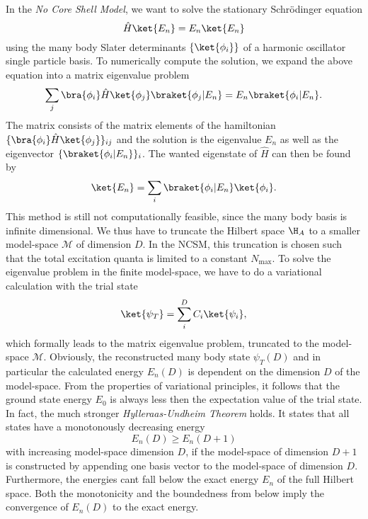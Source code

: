 In the \textit{No Core Shell Model}, we want to solve the stationary Schrödinger equation
\begin{equation}
  \label{eqn:ncsmsgl}
  \hat{H} \ket{E_n} = E_n \ket{E_n}
\end{equation}
using the many body Slater determinants $\{\ket{\phi_i}\}$ of a harmonic oscillator single particle basis. To numerically compute the solution, we expand the above equation into a matrix eigenvalue problem
\begin{equation}
  \sum_j \bra{\phi_i}\hat{H}\ket{\phi_j}\braket{\phi_j | E_n} = E_n \braket{\phi_i | E_n}.
\end{equation}
The matrix consists of the matrix elements of the hamiltonian $\{\bra{\phi_i}\hat{H}\ket{\phi_j}\}_{ij}$ and the solution is the eigenvalue $E_n$ as well as the eigenvector $\{\braket{\phi_i|E_n}\}_i$. The wanted eigenstate of $\hat{H}$ can then be found by
\begin{equation}
  \ket{E_n} = \sum_i \braket{\phi_i | E_n} \ket{\phi_i}.
\end{equation}
This method is still not computationally feasible, since the many body basis is infinite dimensional. We thus have to truncate the Hilbert space $\H_A$ to a smaller model-space $\mathcal{M}$ of dimension $D$. In the NCSM, this truncation is chosen such that the total excitation quanta is limited to a constant $N_{\mathrm{max}}$.
To solve the eigenvalue problem in the finite model-space, we have to do a variational calculation with the trial state
\begin{equation}
  \ket{\psi_T} = \sum_i^{D} C_i \ket{\psi_i},
\end{equation}
which formally leads to the matrix eigenvalue problem, truncated to the model-space $\mathcal{M}$. Obviously, the reconstructed many body state $\psi_T(D)$ and in particular the calculated energy $E_n(D)$ is dependent on the dimension $D$ of the model-space. From the properties of variational principles, it follows that the ground state energy $E_0$ is always less then the expectation value of the trial state. In fact, the much stronger \textit{Hylleraas-Undheim Theorem} holds. It states that all states have a monotonously decreasing energy
\begin{equation}
  E_n(D) \geq E_n(D+1)
\end{equation}
with increasing model-space dimension $D$, if the model-space of dimension $D+1$ is constructed by appending one basis vector to the model-space of dimension $D$. Furthermore, the energies cant fall below the exact energy $E_n$ of the full Hilbert space. Both the monotonicity and the boundedness from below imply the convergence of $E_n(D)$ to the exact energy.

